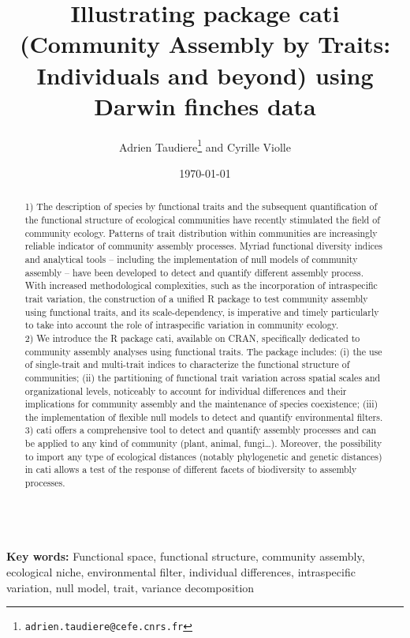 \documentclass[12pt]{article}\usepackage[]{graphicx}\usepackage[]{color}
\title{Illustrating package cati (Community Assembly by Traits: Individuals and beyond) using Darwin finches data}
\author{Adrien Taudiere\thanks{\texttt{adrien.taudiere@cefe.cnrs.fr}} and Cyrille Violle}
\affil{{\footnotesize CEFE - Centre d'Ecologie Fonctionnelle et Evolutive, Montpellier: France}}
\date{\today}
\begin{document}



\maketitle

\begin{abstract}
1) The description of species by functional traits and the subsequent quantification of the functional structure of ecological communities have recently stimulated the field of community ecology. Patterns of trait distribution within communities are increasingly reliable indicator of community assembly processes. Myriad functional diversity indices and analytical tools – including the implementation of null models of community assembly – have been developed to detect and quantify different assembly process. With increased methodological complexities, such as the incorporation of intraspecific trait variation, the construction of a unified R package to test community assembly using functional traits, and its scale-dependency, is imperative and timely particularly to take into account the role of intraspecific variation in community ecology.
\\

2) We introduce the R package cati, available on CRAN, specifically dedicated to community assembly analyses using functional traits. The package includes: (i) the use of single-trait and multi-trait indices to characterize the functional structure of communities; (ii) the partitioning of functional trait variation across spatial scales and organizational levels, noticeably to account for individual differences and their implications for community assembly and the maintenance of species coexistence; (iii) the implementation of flexible null models to detect and quantify environmental filters.
\\

3) cati offers a comprehensive tool to detect and quantify assembly processes and can be applied to any kind of community (plant, animal, fungi…). Moreover, the possibility to import any type of ecological distances (notably phylogenetic and genetic distances) in cati allows a test of the response of different facets of biodiversity to assembly processes.
\end{abstract}

\\
\textbf{Key words:}
Functional space, functional structure, community assembly, ecological niche, environmental filter, individual differences, intraspecific variation, null model, trait, variance decomposition
\end{document}
